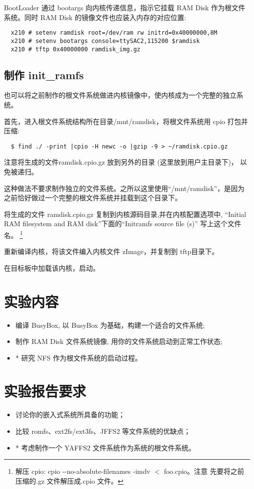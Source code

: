 BootLoader 通过 bootargs 向内核传递信息，指示它挂载 RAM Disk 作为根文件
系统。同时 RAM Disk 的镜像文件也应装入内存的对应位置:
\begin{verbatim}
  x210 # setenv ramdisk root=/dev/ram rw initrd=0x40000000,8M
  x210 # setenv bootargs console=ttySAC2,115200 $ramdisk
  x210 # tftp 0x40000000 ramdisk_img.gz
\end{verbatim}

\subsection{制作 init\_ramfs}
也可以将之前制作的根文件系统做进内核镜像中，使内核成为一个完整的独立系统。

首先，进入根文件系统结构所在目录/mnt/ramdisk，将根文件系统用 cpio
打包并压缩:
\begin{verbatim}
  $ find ./ -print |cpio -H newc -o |gzip -9 > ~/ramdisk.cpio.gz
\end{verbatim}

注意将生成的文件ramdisk.cpio.gz 放到另外的目录 (这里放到用户主目录下)，
以免被递归。

这种做法不要求制作独立的文件系统。之所以这里使用``/mnt/ramdisk''，是因为
之前恰好做过一个完整的根文件系统并挂载到这个目录下。

将生成的文件 ramdisk.cpio.gz 复制到内核源码目录,并在内核配置选项中,
``Initial RAM filesystem and RAM disk''下面的``Initramfs source file (s)''
写上这个文件名。
\footnote{解压 cpio: cpio -{}-no-absolute-filenames -imdv $<$ foo.cpio。注意
    先要将之前压缩的.gz 文件解压成.cpio 文件。}

重新编译内核，将该文件编入内核文件 zImage，并复制到 tftp目录下。

在目标板中加载该内核，启动。

\section{实验内容}
\begin{itemize}
  \item 编译 BusyBox, 以 BusyBox 为基础，构建一个适合的文件系统;
  \item 制作 RAM Disk 文件系统镜像, 用你的文件系统启动到正常工作状态;
  \item * 研究 NFS 作为根文件系统的启动过程。
\end{itemize}

\section{实验报告要求}
\begin{itemize}
  \item 讨论你的嵌入式系统所具备的功能；
  \item 比较 romfs、ext2fs/ext3fs、JFFS2 等文件系统的优缺点；
  \item * 考虑制作一个 YAFFS2 文件系统作为系统的根文件系统。
\end{itemize}


